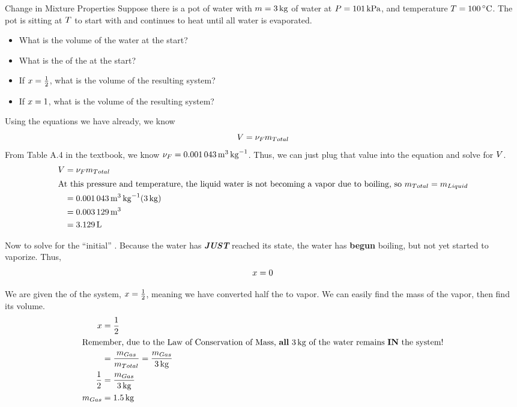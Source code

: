 \begin{example}{Change in Mixture Properties}
  Suppose there is a pot of water with $m = \SI{3}{\kilo\gram}$ of water at $P = \SI{101}{\kilo\pascal}$, and temperature $\Temp = \SI{100}{\degreeCelsius}$.
  The pot is sitting at $T$ to start with and continues to heat until all water is evaporated.
  \begin{itemize}[noitemsep]
  \item What is the volume of the water at the start?
  \item What is the  of the  at the start?
  \item If $x=\frac{1}{2}$, what is the volume of the resulting system?
  \item If $x=1$, what is the volume of the resulting system?
  \end{itemize}
  \tcblower{}
  Using the equations we have already, we know
  \begin{equation*}
    V = \nu_{F} m_{Total}
  \end{equation*}
  From Table A.4 in the textbook, we know $\nu_{F} = \SI{0.001043}{\meter\cubed\per\kilo\gram}$.
  Thus, we can just plug that value into the equation and solve for $V$.
  \begin{align*}
    V &= \nu_{F} m_{Total} \\
    \intertext{At this pressure and temperature, the liquid water is not becoming a vapor due to boiling, so $m_{Total} = m_{Liquid}$}
            &= \SI{0.001043}{\meter\cubed\per\kilo\gram} (\SI{3}{\kilo\gram}) \\
            &= \SI{0.003129}{\meter\cubed} \\
            &= \SI{3.129}{\liter}
  \end{align*}

  Now to solve for the ``initial'' .
  Because the water has \textbf{\textit{JUST}} reached its  state, the water has \textbf{begun} boiling, but not yet started to vaporize.
  Thus,
  \begin{equation*}
    x = 0
  \end{equation*}

  We are given the  of the system, $x=\frac{1}{2}$, meaning we have converted half the  to vapor.
  We can easily find the mass of the vapor, then find its volume.
  \begin{align*}
    x &= \frac{1}{2} \\
    \intertext{Remember, due to the Law of Conservation of Mass, \textbf{all} \SI{3}{\kilo\gram} of the water remains \textbf{IN} the system!}
      &= \frac{m_{Gas}}{m_{Total}} = \frac{m_{Gas}}{\SI{3}{\kilo\gram}} \\
    \frac{1}{2} &= \frac{m_{Gas}}{\SI{3}{\kilo\gram}} \\
    m_{Gas} &= \SI{1.5}{\kilo\gram} \\
  \end{align*}


\end{example}
